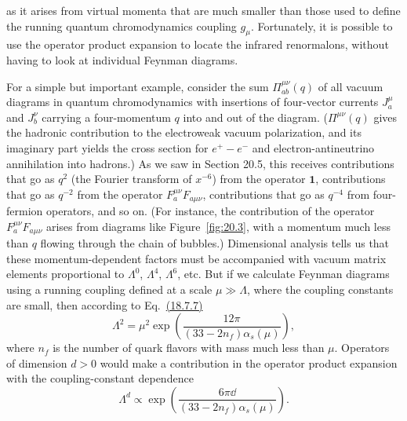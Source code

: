 

as it arises from virtual momenta that are much smaller than those used to define the running quantum chromodynamics coupling $g_\mu$. Fortunately, it is possible to use the operator product expansion to locate the infrared renormalons, without having to look at individual Feynman diagrams.

For a simple but important example, consider the sum $\Pi_{ab}^{\mu\nu}(q)$ of all vacuum diagrams in quantum chromodynamics with insertions of four-vector currents $J_a^\mu$ and $J_b^\nu$ carrying a four-momentum $q$ into and out of the diagram. ($\Pi^{\mu\nu}(q)$ gives the hadronic contribution to the electroweak vacuum polarization, and its imaginary part yields the cross section for $e^+-e^-$ and electron-antineutrino annihilation into hadrons.) As we saw in Section 20.5, this receives contributions that go as $q^2$ (the Fourier transform of $x^{-6}$) from the operator $\mathbf{1}$, contributions that go as $q^{-2}$ from the operator $F_a^{\mu\nu}F_{a\mu\nu}$, contributions that go as $q^{-4}$ from four-fermion operators, and so on. (For instance, the contribution of the operator $F_a^{\mu\nu}F_{a\mu\nu}$ arises from diagrams like Figure~\ref{fig:20.3}, with a momentum much less than $q$ flowing through the chain of bubbles.) Dimensional analysis tells us that these momentum-dependent factors must be accompanied with vacuum matrix elements proportional to $\Lambda^0$, $\Lambda^4$, $\Lambda^6$, etc. But if we calculate Feynman diagrams using a running coupling defined at a scale $\mu\gg\Lambda$, where the coupling constants are small, then according to Eq.~\hyperref[eq:18.7.7]{(18.7.7)}
\begin{equation}
\Lambda^2
=\mu^2\exp\left(
\frac{12\pi}{(33-2n_f)\alpha_s(\mu)}
\right),
\tag{20.7.18}\label{eq:20.7.18}
\end{equation}
where $n_f$ is the number of quark flavors with mass much less than $\mu$. Operators of dimension $d>0$ would make a contribution in the operator product expansion with the coupling-constant dependence
\begin{equation}
\Lambda^d
\propto
\exp\left(
\frac{6\pi \dd}{(33-2n_f)\alpha_s(\mu)}
\right).
\tag{20.7.19}\label{eq:20.7.19}
\end{equation}


